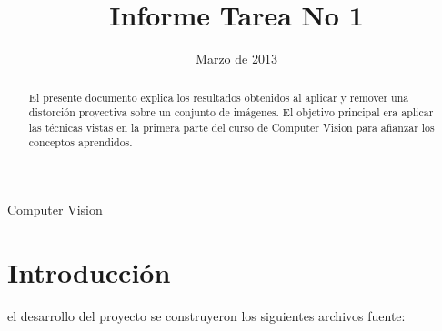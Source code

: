 \documentclass{IEEEtran}
\begin{document}
\title{Informe Tarea No 1}
\date {Marzo de 2013}
\author{
}
\maketitle


\begin{abstract}
El presente documento explica los resultados obtenidos al aplicar
y remover una distorción proyectiva sobre un conjunto de imágenes.
El objetivo principal era aplicar las técnicas vistas
en la primera parte del curso de Computer Vision para afianzar 
los conceptos aprendidos.
\end{abstract}

\begin{IEEEkeywords}
Computer Vision
\end{IEEEkeywords}

\section{Introducción}
 el desarrollo del proyecto se construyeron
los siguientes archivos fuente:
\end{document}
